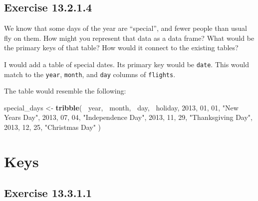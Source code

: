 \documentclass[]{book}
\newenvironment{Shaded}{\begin{snugshade}}{\end{snugshade}}
\newcommand{\DecValTok}[1]{\textcolor[rgb]{0.00,0.00,0.81}{#1}}
\newcommand{\KeywordTok}[1]{\textcolor[rgb]{0.13,0.29,0.53}{\textbf{#1}}}
\newcommand{\NormalTok}[1]{#1}
\newcommand{\OperatorTok}[1]{\textcolor[rgb]{0.81,0.36,0.00}{\textbf{#1}}}
\newcommand{\StringTok}[1]{\textcolor[rgb]{0.31,0.60,0.02}{#1}}
\theoremstyle{plain}
\theoremstyle{remark}
\begin{document}
\hypertarget{exercise-13.2.1.4}{%
\subsection*{\texorpdfstring{Exercise {13.2.1.4}}{Exercise 13.2.1.4}}\label{exercise-13.2.1.4}}

We know that some days of the year are ``special'', and fewer people than usual fly on them. How might you represent that data as a data frame? What would be the primary keys of that table? How would it connect to the existing tables?

I would add a table of special dates.
Its primary key would be \texttt{date}.
This would match to the \texttt{year}, \texttt{month},
and \texttt{day} columns of \texttt{flights}.

The table would resemble the following:

\begin{Shaded}
\begin{Highlighting}[]
\NormalTok{special_days <-}\StringTok{ }\KeywordTok{tribble}\NormalTok{(}
  \OperatorTok{~}\NormalTok{year, }\OperatorTok{~}\NormalTok{month, }\OperatorTok{~}\NormalTok{day, }\OperatorTok{~}\NormalTok{holiday,}
  \DecValTok{2013}\NormalTok{, }\DecValTok{01}\NormalTok{, }\DecValTok{01}\NormalTok{, }\StringTok{"New Years Day"}\NormalTok{,}
  \DecValTok{2013}\NormalTok{, }\DecValTok{07}\NormalTok{, }\DecValTok{04}\NormalTok{, }\StringTok{"Independence Day"}\NormalTok{,}
  \DecValTok{2013}\NormalTok{, }\DecValTok{11}\NormalTok{, }\DecValTok{29}\NormalTok{, }\StringTok{"Thanksgiving Day"}\NormalTok{,}
  \DecValTok{2013}\NormalTok{, }\DecValTok{12}\NormalTok{, }\DecValTok{25}\NormalTok{, }\StringTok{"Christmas Day"}
\NormalTok{)}
\end{Highlighting}
\end{Shaded}

\hypertarget{keys}{%
\section{Keys}\label{keys}}

\hypertarget{exercise-13.3.1.1}{%
\subsection*{\texorpdfstring{Exercise {13.3.1.1}}{Exercise 13.3.1.1}}\label{exercise-13.3.1.1}}
\end{document}
